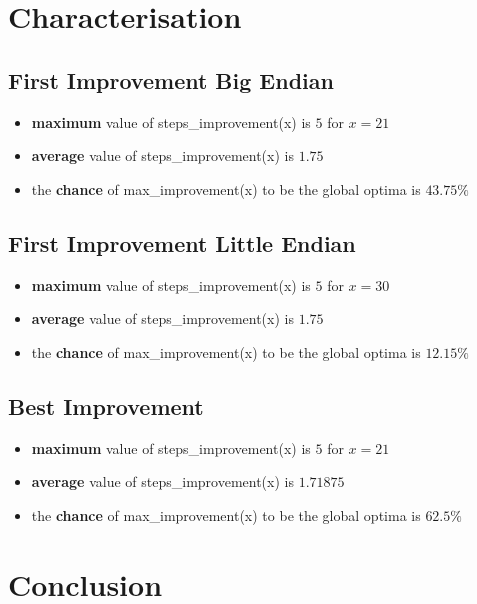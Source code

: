 \documentclass{article}
\begin{document}
\newpage
\section{Characterisation}
\subsection{First Improvement Big Endian}
\begin{itemize}
    \item \textbf{maximum} value of steps\_improvement(x) is $5$ for $x = 21$
    \item \textbf{average} value of steps\_improvement(x) is $1.75$
    \item the \textbf{chance} of max\_improvement(x) to be the global optima is $43.75\%$ 
\end{itemize}


\subsection{First Improvement Little Endian}
\begin{itemize}
    \item \textbf{maximum} value of steps\_improvement(x) is $5$ for $x = 30$
    \item \textbf{average} value of steps\_improvement(x) is $1.75$
    \item the \textbf{chance} of max\_improvement(x) to be the global optima is $12.15\%$ 
\end{itemize}

\subsection{Best Improvement}
\begin{itemize}
    \item \textbf{maximum} value of steps\_improvement(x) is $5$ for $x = 21$
    \item \textbf{average} value of steps\_improvement(x) is $1.71875$
    \item the \textbf{chance} of max\_improvement(x) to be the global optima is $62.5\%$ 
\end{itemize}

\newpage
\section{Conclusion}
\end{document}
